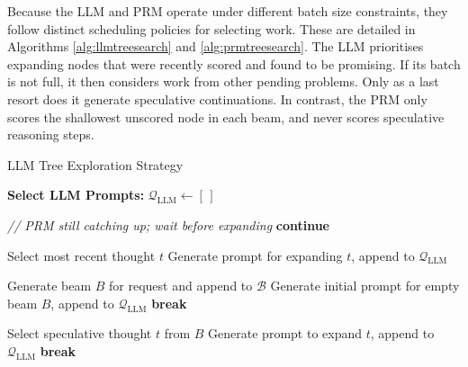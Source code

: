 \documentclass[12pt,twoside]{report}
\begin{document}
Because the LLM and PRM operate under different batch size constraints, they follow distinct scheduling policies for selecting work. 
These are detailed in Algorithms \ref{alg:llmtreesearch} and \ref{alg:prmtreesearch}. 
The LLM prioritises expanding nodes that were recently scored and found to be promising. 
If its batch is not full, it then considers work from other pending problems. 
Only as a last resort does it generate speculative continuations. 
In contrast, the PRM only scores the shallowest unscored node in each beam, and never scores speculative reasoning steps.

\begin{algorithm}[H]\label{alg:llmtreesearch}
\caption{LLM Tree Exploration Strategy}
\begin{algorithmic}[1]
\Statex \textbf{Select LLM Prompts:}
\State $\mathcal{Q}_{\text{LLM}} \gets [\,]$


 
      \State \textit{// PRM still catching up; wait before expanding}
      \State \textbf{continue}
  \EndIf

  \State Select most recent thought $t$
  \State Generate prompt for expanding $t$, append to $\mathcal{Q}_{\text{LLM}}$
\EndFor

     
      \State Generate beam $B$ for request and append to $\mathcal{B}$
      \State Generate initial prompt for empty beam $B$, append to  $\mathcal{Q}_{\text{LLM}}$
          \State \textbf{break}
      \EndIf
    \EndFor
\EndIf

     
            \State Select speculative thought $t$ from $B$
            \State Generate prompt to expand $t$, append to $\mathcal{Q}_{\text{LLM}}$
                \State \textbf{break}
            \EndIf
        \EndIf
    \EndFor
\EndIf
\end{algorithmic}
\end{algorithm}
\end{document}
